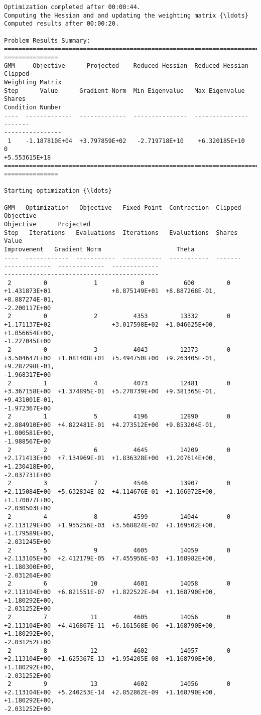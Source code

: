 \begin{Verbatim}[commandchars=\\\{\}]
Optimization completed after 00:00:44.
Computing the Hessian and and updating the weighting matrix {\ldots}
Computed results after 00:00:20.

Problem Results Summary:
================================================================================
===============
GMM     Objective      Projected    Reduced Hessian  Reduced Hessian  Clipped
Weighting Matrix
Step      Value      Gradient Norm  Min Eigenvalue   Max Eigenvalue   Shares
Condition Number
----  -------------  -------------  ---------------  ---------------  -------
----------------
 1    -1.187810E+04  +3.797859E+02   -2.719718E+10    +6.320185E+10      0
+5.553615E+18
================================================================================
===============

Starting optimization {\ldots}

GMM   Optimization   Objective   Fixed Point  Contraction  Clipped    Objective
Objective      Projected
Step   Iterations   Evaluations  Iterations   Evaluations  Shares       Value
Improvement   Gradient Norm                     Theta
----  ------------  -----------  -----------  -----------  -------
-------------  -------------  -------------
-------------------------------------------
 2         0             1            0           600         0
+1.431873E+01                 +8.875149E+01  +8.887268E-01, +8.887274E-01,
-2.200117E+00
 2         0             2          4353         13332        0
+1.171137E+02                 +3.017598E+02  +1.046625E+00, +1.056654E+00,
-1.227045E+00
 2         0             3          4043         12373        0
+3.504647E+00  +1.081408E+01  +5.494750E+00  +9.263405E-01, +9.287298E-01,
-1.968317E+00
 2         1             4          4073         12481        0
+3.367158E+00  +1.374895E-01  +5.270739E+00  +9.381365E-01, +9.431001E-01,
-1.972367E+00
 2         1             5          4196         12890        0
+2.884910E+00  +4.822481E-01  +4.273512E+00  +9.853204E-01, +1.000581E+00,
-1.988567E+00
 2         2             6          4645         14209        0
+2.171413E+00  +7.134969E-01  +1.836328E+00  +1.207614E+00, +1.230418E+00,
-2.037731E+00
 2         3             7          4546         13907        0
+2.115084E+00  +5.632834E-02  +4.114676E-01  +1.166972E+00, +1.170077E+00,
-2.030503E+00
 2         4             8          4599         14044        0
+2.113129E+00  +1.955256E-03  +3.568824E-02  +1.169502E+00, +1.179589E+00,
-2.031245E+00
 2         5             9          4605         14059        0
+2.113105E+00  +2.412179E-05  +7.455956E-03  +1.168982E+00, +1.180300E+00,
-2.031264E+00
 2         6            10          4601         14058        0
+2.113104E+00  +6.821551E-07  +1.822522E-04  +1.168790E+00, +1.180292E+00,
-2.031252E+00
 2         7            11          4605         14056        0
+2.113104E+00  +4.416867E-11  +6.161568E-06  +1.168790E+00, +1.180292E+00,
-2.031252E+00
 2         8            12          4602         14057        0
+2.113104E+00  +1.625367E-13  +1.954205E-08  +1.168790E+00, +1.180292E+00,
-2.031252E+00
 2         9            13          4602         14056        0
+2.113104E+00  +5.240253E-14  +2.852862E-09  +1.168790E+00, +1.180292E+00,
-2.031252E+00


\end{Verbatim}
